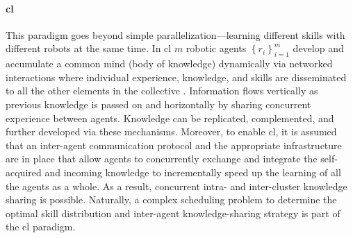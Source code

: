 \documentclass[12pt]{article}
\begin{document}
\paragraph*{\textbf{\Acl{cl}}}
This paradigm goes beyond simple parallelization---learning different skills with different robots at the same time. In \ac{cl} $m$ robotic agents $ \left\lbrace r_i \right\rbrace_{i=1}^{m} $ develop and accumulate a common mind (body of knowledge) dynamically via networked interactions where individual experience, knowledge, and skills are disseminated to all the other elements in the collective \cite{Garavan2012CollectiveLearning}. Information flows vertically as previous knowledge is passed on and horizontally by sharing concurrent experience between agents. Knowledge can be replicated, complemented, and further developed via these mechanisms. Moreover, to enable \ac{cl}, it is assumed that an inter-agent communication protocol and the appropriate infrastructure are in place that allow agents to concurrently exchange and integrate the self-acquired and incoming knowledge to incrementally speed up the learning of all the agents as a whole. As a result, concurrent intra- and inter-cluster knowledge sharing is possible. Naturally, a complex scheduling problem to determine the optimal skill distribution and inter-agent knowledge-sharing strategy is part of the \ac{cl} paradigm. 
\end{document}
